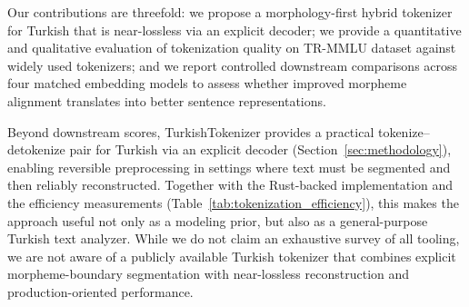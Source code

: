 Our contributions are threefold: we propose a morphology-first hybrid tokenizer for Turkish that is near-lossless via an explicit decoder; we provide a quantitative and qualitative evaluation of tokenization quality on TR-MMLU dataset against widely used tokenizers; and we report controlled downstream comparisons across four matched embedding models to assess whether improved morpheme alignment translates into better sentence representations.

Beyond downstream scores, TurkishTokenizer provides a practical tokenize--detokenize pair for Turkish via an explicit decoder (Section~\ref{sec:methodology}), enabling reversible preprocessing in settings where text must be segmented and then reliably reconstructed. Together with the Rust-backed implementation and the efficiency measurements (Table~\ref{tab:tokenization_efficiency}), this makes the approach useful not only as a modeling prior, but also as a general-purpose Turkish text analyzer. While we do not claim an exhaustive survey of all tooling, we are not aware of a publicly available Turkish tokenizer that combines explicit morpheme-boundary segmentation with near-lossless reconstruction and production-oriented performance.